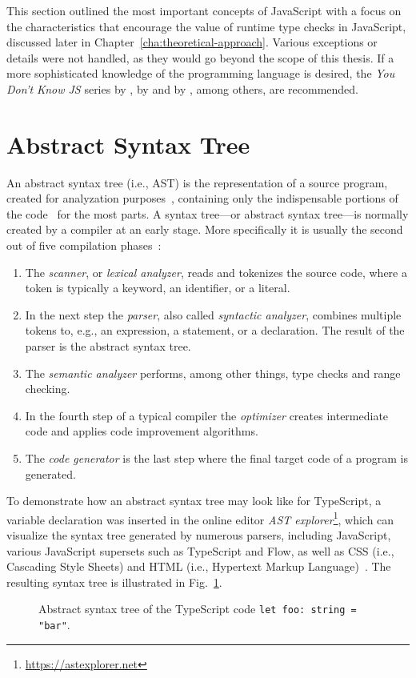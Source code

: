 This section outlined the most important concepts of JavaScript with a focus on the characteristics that encourage the value of runtime type checks in JavaScript, discussed later in Chapter~\ref{cha:theoretical-approach}. Various exceptions or details were not handled, as they would go beyond the scope of this thesis. If a more sophisticated knowledge of the programming language is desired, the \emph{You Don't Know JS} series by \citeauthor{YDKJS:UpAndGoing:Simpson:2015}, \emph{\emph{}} by \citeauthor{JavaScriptTheGoodParts:Crockford:2008} and \emph{\emph{}} by \citeauthor{JavaScriptTheDefinitiveGuide:Flanagan:2011}, among others, are recommended.

\section{Abstract Syntax Tree}
\label{sec:ast}

An abstract syntax tree (i.e., AST) is the representation of a source program, created for analyzation purposes~\cite[p.~99-19]{CompilersAndInterpreters:Kenneth:2004}, containing only the indispensable portions of the code~\cite[p.~12]{FormaleSprachenAbstrakteAutomatenUndCompiler:Wagenknecht:2014} for the most parts. A syntax tree---or abstract syntax tree---is normally created by a compiler at an early stage. More specifically it is usually the second out of five compilation phases~\cite[pp.~99-2--99-3]{CompilersAndInterpreters:Kenneth:2004}: 
\begin{enumerate}
  \item The \emph{scanner}, or \emph{lexical analyzer}, reads and tokenizes the source code, where a token is typically a keyword, an identifier, or a literal.
  \item In the next step the \emph{parser}, also called \emph{syntactic analyzer}, combines multiple tokens to, e.g., an expression, a statement, or a declaration. The result of the parser is the abstract syntax tree.
  \item The \emph{semantic analyzer} performs, among other things, type checks and range checking.
  \item In the fourth step of a typical compiler the \emph{optimizer} creates intermediate code and applies code improvement algorithms.
  \item The \emph{code generator} is the last step where the final target code of a program is generated.
\end{enumerate}
To demonstrate how an abstract syntax tree may look like for TypeScript, a variable declaration was inserted in the online editor \emph{AST explorer}\footnote{\url{https://astexplorer.net}}, which can visualize the syntax tree generated by numerous parsers, including JavaScript, various JavaScript supersets such as TypeScript and Flow, as well as CSS (i.e., Cascading Style Sheets) and HTML (i.e., Hypertext Markup Language)~\cite{ASTExplorer}. The resulting syntax tree is illustrated in Fig.~\ref{fig:ast}.

\begin{figure}
\centering

\caption{Abstract syntax tree of the TypeScript code \texttt{let foo: string = "bar"}.}
\label{fig:ast}
\end{figure}
